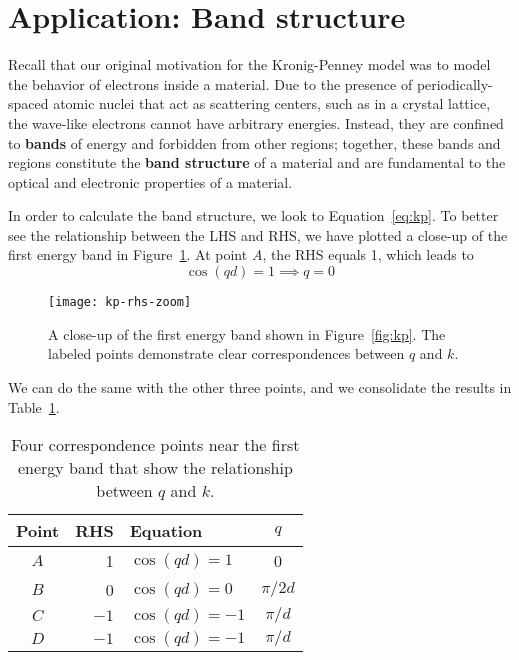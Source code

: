
\section{Application: Band structure}
Recall that our original motivation for the Kronig-Penney model was to model the behavior of electrons inside a material. Due to the presence of periodically-spaced atomic nuclei that act as scattering centers, such as in a crystal lattice, the wave-like electrons cannot have arbitrary energies. Instead, they are confined to \textbf{bands} of energy and forbidden from other regions; together, these bands and regions constitute the \textbf{band structure} of a material and are fundamental to the optical and electronic properties of a material. \par 

In order to calculate the band structure, we look to Equation~\ref{eq:kp}. To better see the relationship between the LHS and RHS, we have plotted a close-up of the first energy band in Figure~\ref{fig:kp-zoom}. At point $A$, the RHS equals 1, which leads to
\begin{equation*}
	\cos(qd) = 1 \implies q = 0
\end{equation*}

\begin{figure}[!h]
	\centering 
	\texttt{[image: kp-rhs-zoom]}
	\caption{A close-up of the first energy band shown in Figure~\ref{fig:kp}. The labeled points demonstrate clear correspondences between $q$ and $k$.}
	\label{fig:kp-zoom}
\end{figure}

We can do the same with the other three points, and we consolidate the results in Table~\ref{tab:qvk}.

\begin{table}[!h]
	\centering
	\begin{tabular}{crlc}
		Point & RHS & Equation & $q$ \\ \toprule
		$A$ & 1 & $\cos(qd) = 1$ & 0 \\
		$B$ & 0 & $\cos(qd) = 0$ & $\pi/2d$ \\
		$C$ & $-1$ & $\cos(qd) = -1$ & $\pi/d$ \\
		$D$ & $-1$ & $\cos(qd) = -1$ & $\pi/d$
	\end{tabular}
	\caption{Four correspondence points near the first energy band that show the relationship between $q$ and $k$.}
	\label{tab:qvk}
\end{table}

